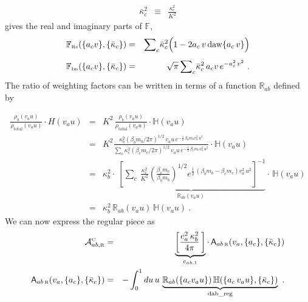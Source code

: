 \documentclass[preprint,12pt,eqsecnum,nofootinbib,amsmath,amssymb]{revtex4}
\newcommand{\smC}{{\rm\scriptscriptstyle C}}
\newcommand{\smR}{{\rm\scriptscriptstyle R}}
\newcommand{\smRe}{{\rm\scriptscriptstyle Re}}
\newcommand{\smIm}{{\rm\scriptscriptstyle Im}}
\begin{document}
{{\begin{eqnarray}
\\[5pt]
  \bar\kappa_c^2 
  &\equiv &
  \frac{\kappa_c^2}{K^2} 
\end{eqnarray}
gives the real and imaginary parts of $\mathbb{F}$, 
\begin{eqnarray}
  \mathbb{F}_\smRe(\{a_c v\},\{\bar\kappa_c\}) &=& 
  {\sum}_c \bar\kappa_c^2 \Big(1 - 2 a_c\, v\,{\rm daw}\{a_c\, v\}\Big)
\label{defFreA}
\\[5pt]
  \mathbb{F}_\smIm(\{a_c v\},\{\bar\kappa_c\}) &=& 
  \sqrt{\pi}\,{\sum}_c \bar\kappa_c^2\,a_c v\, e^{-a_c^2\, v^2} \ .
\label{defFimA}
\end{eqnarray}
The ratio of weighting factors can be written in terms of a function
$\mathbb{R}_{ab}$ defined by

\begin{eqnarray}
  \frac{\rho_b(v_a u)}{\rho_\text{total}(v_a u)} \cdot H(v_a u)
  &=&
  K^2\,\frac{\rho_b(v_a u)}{\rho_\text{total}(v_a u)} \cdot
  \mathbb{H}(v_a u)
\\[5pt]
  &=&
  K^2 \frac{
  \kappa_b^2 \left(\beta_b m_b/2\pi\right)^{1/2} \,v_a u\,
  e^{-\frac{1}{2}\,\beta_b m_b v_a^2\, u^2}}
  {{\sum}_c\kappa_c^2 \left(\beta_c m_c/2\pi\right)^{1/2} 
  \, v_a u\,  e^{-\frac{1}{2}\,\beta_c m_c v_a^2\, u^2}}
  \cdot \mathbb{H}(v_a u)
\\[5pt]
  &=&
  \kappa_b^2 \cdot 
  \underbrace{~
  \left[{\sum}_c \, \frac{\kappa_c^2}{K^2} 
  \left(\frac{\beta_c m_c}{\beta_b m_b}\right)^{1/2} 
  e^{\frac{1}{2}\,(\beta_b m_b-\beta_c m_c) v_a^2\, u^2}
  \right]^{-1}}_{\mathbb{R}_{ab}(v_a u)} \cdot \,
  \mathbb{H}(v_a u) 
\\[5pt]
  &=&
  \kappa_b^2 \, \mathbb{R}_{ab}(v_a u) \, \mathbb{H}(v_a u) \ .
\end{eqnarray}
We can now express the regular piece as
\begin{eqnarray}
  {\cal A}^\smC_{ab,\smR}
  &=& 
  \underbrace{
  \left[
  \frac{e_a^2\, \kappa_b^2}{4\pi}\,
  \right] 
  }_{c_{ab,1}}
  \cdot \,
  {\sf A}_{ab\,\smR}(v_a,\{a_c\},\{\bar\kappa_c\})
\\
  {\sf A}_{ab\,\smR}(v_a,\{a_c\},\{\bar\kappa_c\})
  &=&
  -\int_0^1 du\, u\,
  \underbrace{
  \mathbb{R}_{ab}(\{a_c v_a u\})\,
  \mathbb{H}(\{a_c\,v_a u\},\{\bar\kappa_c\})  
  }_{\rm dab\_reg}
  \ .
\end{eqnarray}

}}
\end{document}
